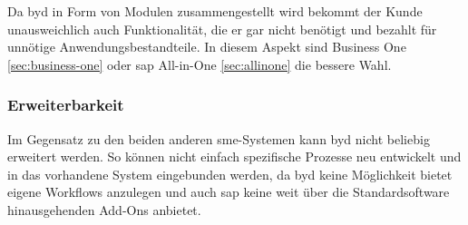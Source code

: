 Da \gls{byd} in Form von Modulen zusammengestellt wird bekommt der Kunde unausweichlich auch Funktionalität, die er gar nicht benötigt und bezahlt für unnötige Anwendungsbestandteile. In diesem Aspekt sind Business One \ref{sec:business-one} oder \gls{sap} All-in-One \ref{sec:allinone} die bessere Wahl.

\subsubsection{Erweiterbarkeit}

Im Gegensatz zu den beiden anderen \gls{sme}-Systemen kann \gls{byd} nicht beliebig erweitert werden. So können nicht einfach spezifische Prozesse neu entwickelt und in das vorhandene System eingebunden werden, da \gls{byd} keine Möglichkeit bietet eigene Workflows anzulegen und auch \gls{sap} keine weit über die Standardsoftware hinausgehenden Add-Ons anbietet.

